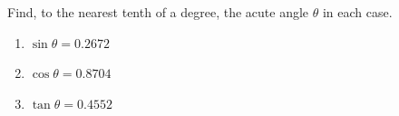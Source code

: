 Find, to the nearest tenth of a degree, the acute angle $\theta$ in each case.
\begin{enumerate}
\item[(a)] $\sin\theta=0.2672$
\item[(b)] $\cos\theta=0.8704$
\item[(c)] $\tan\theta=0.4552$
\end{enumerate}
